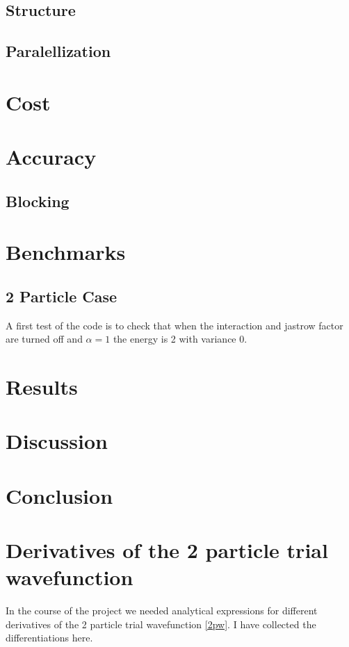 \documentclass[a4paper,norsk,10pt]{article}
\begin{document}
\subsection{Structure}
\subsection{Paralellization}

\section{Cost}

\section{Accuracy}

\subsection{Blocking}

\section{Benchmarks}

\subsection{2 Particle Case}
A first test of the code is to check that when the interaction and jastrow factor are turned off and $\alpha = 1$ the energy is 2 with variance 0.

\section{Results}

\section{Discussion}

\section{Conclusion}



\appendix
\section{Derivatives of the 2 particle trial wavefunction}
In the course of the project we needed analytical expressions for different derivatives of the 2 particle trial wavefunction \ref{2pw}. I have collected
the differentiations here.
\end{document}
